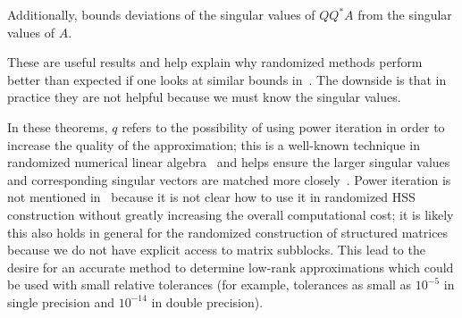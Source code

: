 \noindent
Additionally, \cite[Theorem 5.6]{gu2015subspace} bounds deviations
of the singular values of $QQ^{*}A$ from the singular values of $A$.

These are useful results and help explain why randomized methods
perform better than expected if one looks at similar
bounds in~\cite{RandomReview2011}.
The downside is that in practice they are not helpful because
we must know the singular values.

In these theorems, $q$ refers to the possibility of using
power iteration in order to increase the quality of the approximation;
this is a well-known technique in randomized numerical linear
algebra~\cite{RandomReview2011,yu2018efficient,
martinsson2016randomized} and helps ensure the larger singular values
and corresponding singular vectors are matched more
closely~\cite{gu2015subspace,saibaba2019randomized}.
Power iteration is not mentioned in~\cite{randomHSSLBL}
because it is not clear how to use it in
randomized HSS construction without greatly increasing the
overall computational cost; it is likely this also holds in general
for the randomized construction of structured matrices
because we do not have explicit access to matrix subblocks.
This lead to the desire for an accurate method to determine
low-rank approximations which could be used with small relative
tolerances (for example, tolerances as small as
$10^{-5}$ in single precision and $10^{-14}$ in double precision).
